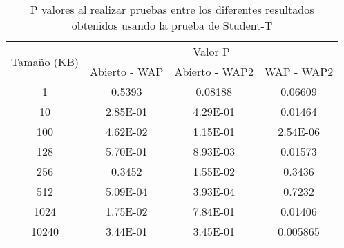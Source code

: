 
        \begin{table}[H]
            \begin{tabular}{|c|c|c|c|}
                \hline \multirow{2}{*}{Tamaño (KB)}&\multicolumn{3}{c|}{Valor P}\\
                \cline{2-4}& Abierto - WAP & Abierto - WAP2 & WAP - WAP2 \\\hline
                1       & 0.5393    & 0.08188   & 0.06609 \\\hline
                10      & 2.85E-01  & 4.29E-01  & 0.01464 \\\hline
                100     & 4.62E-02  & 1.15E-01  & 2.54E-06 \\\hline
                128     & 5.70E-01  & 8.93E-03  & 0.01573 \\\hline
                256     & 0.3452    & 1.55E-02  & 0.3436 \\\hline
                512     & 5.09E-04  & 3.93E-04  & 0.7232 \\\hline
                1024    & 1.75E-02  & 7.84E-01  & 0.01406 \\\hline
                10240   & 3.44E-01  & 3.45E-01  & 0.005865 \\\hline
            \end{tabular}
            \caption{P valores al realizar pruebas entre los diferentes resultados obtenidos usando la prueba de Student-T}
            \label{tab:student}

        \end{table}
